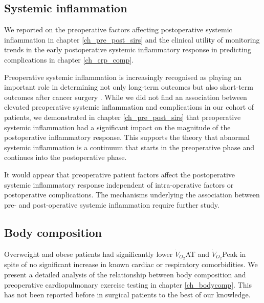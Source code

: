 \subsection{Systemic inflammation}
We reported on the preoperative factors affecting postoperative systemic inflammation in chapter \ref{ch_pre_post_sirs} and the clinical utility of monitoring trends in the early postoperative systemic inflammatory response in predicting complications in chapter \ref{ch_crp_comp}.

Preoperative systemic inflammation is increasingly recognised as playing an important role in determining not only long-term outcomes but also short-term outcomes after cancer surgery \parencite{kubo_elevated_2013, mohri_correlation_2014, moyes_preoperative_2009, neal_preoperative_2011, vashist_glasgow_2010,  haupt_association_1997}.
While we did not find an association between elevated preoperative systemic inflammation and complications in our cohort of patients, we demonstrated in chapter \ref{ch_pre_post_sirs} that preoperative systemic inflammation had a significant impact on  the magnitude of the postoperative inflammatory response.
This supports the theory that abnormal systemic inflammation is a continuum that starts in the preoperative phase and continues into the postoperative phase.

It would appear that preoperative patient factors affect the postoperative systemic inflammatory response independent of intra-operative factors or postoperative complications. 
The mechanisms underlying the association between pre- and post-operative systemic inflammation require further study.

\subsection{Body composition}
Overweight and obese patients had significantly lower $\dot{V}_{O_2}$AT and $\dot{V}_{O_2}$Peak in spite of no significant increase in known cardiac or respiratory comorbidities. 
We present a detailed analysis of the relationship between body composition and preoperative cardiopulmonary exercise testing in chapter \ref{ch_bodycomp}.
This has not been reported before in surgical patients to the best of our knowledge. 


